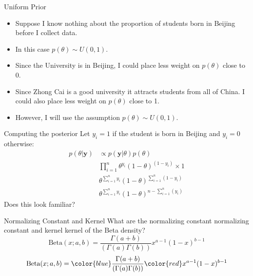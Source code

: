 \documentclass[10pt]{beamer}
\begin{document}
\begin{frame}{Uniform Prior}
  \begin{itemize}
  \item Suppose I know nothing about the proportion of students born in Beijing before I collect data.

  \item In this case $p(\theta)\sim U(0,1)$.

  \item Since the University is in Beijing, I could place less weight on $p(\theta)$ close to 0.

  \item Since Zhong Cai is a good university it attracts students from all of China. I could also place less weight on $p(\theta)$ close to 1.

  \item However, I will use the assumption $p(\theta)\sim U(0,1)$.
  \end{itemize}
\end{frame}
\begin{frame}{Computing the posterior}
  Let $y_i=1$ if the student is born in Beijing and $y_i=0$ otherwise:
  \begin{align}
    p(\theta|{\bm y})&\propto p({\bm y}|\theta)p(\theta)\\
                     &\prod_{i=1}^n \theta^{y_i}(1-\theta)^{(1-y_i)}\times 1\\
                     &\theta^{\sum\limits_{i=1}^ny_i}(1-\theta)^{\sum\limits_{i=1}^n(1-y_i)}\\
                     &\theta^{\sum\limits_{i=1}^ny_i}(1-\theta)^{n-\sum\limits_{i=1}^n(y_i)}
  \end{align}
  Does this look familiar?
\end{frame}
\begin{frame}{Normalizing Constant and Kernel}
  What are the
  { normalizing constant}{{\color{blue} normalizing constant}}
  and
  {kernel}{{\color{red} kernel}}
  of the Beta density?
  {
    \begin{equation}
      \mbox{Beta}(x;a,b)=\frac{\Gamma(a+b)}{(\Gamma(a)\Gamma(b))}x^{a-1}(1-x)^{b-1}
    \end{equation}
  }{
    \begin{equation}
      \mbox{Beta}(x;a,b)={\color{blue}\frac{\Gamma(a+b)}{(\Gamma(a)\Gamma(b))}}{\color{red}x^{a-1}(1-x)^{b-1}}
    \end{equation}
  }

\end{frame}
\end{document}
